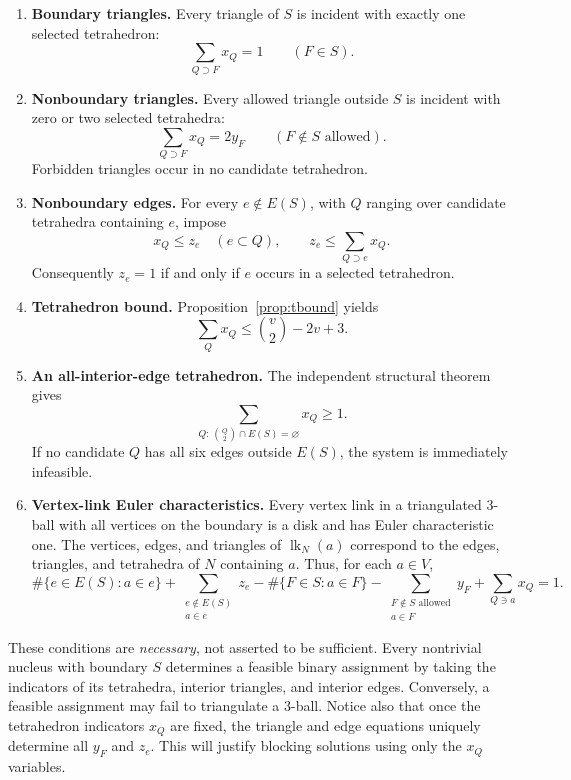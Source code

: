 \documentclass[11pt]{article}
\begin{document}
\begin{enumerate}[label=(\arabic*),leftmargin=*]
\item \textbf{Boundary triangles.} Every triangle of $S$ is incident with
exactly one selected tetrahedron:
\[
 \sum_{Q\supset F}x_Q=1\qquad(F\in S).
\]

\item \textbf{Nonboundary triangles.} Every allowed triangle outside $S$
is incident with zero or two selected tetrahedra:
\[
 \sum_{Q\supset F}x_Q=2y_F
 \qquad(F\notin S\text{ allowed}).
\]
Forbidden triangles occur in no candidate tetrahedron.

\item \textbf{Nonboundary edges.} For every $e\notin E(S)$, with
$Q$ ranging over candidate tetrahedra containing $e$, impose
\[
 x_Q\le z_e\quad(e\subset Q),\qquad
 z_e\le\sum_{Q\supset e}x_Q.
\]
Consequently $z_e=1$ if and only if $e$ occurs in a selected tetrahedron.

\item \textbf{Tetrahedron bound.} Proposition~\ref{prop:tbound} yields
\[
 \sum_Qx_Q\le\binom v2-2v+3.
\]

\item \textbf{An all-interior-edge tetrahedron.} The independent structural
theorem gives
\[
 \sum_{Q:\,\binom Q2\cap E(S)=\varnothing}x_Q\ge1.
\]
If no candidate $Q$ has all six edges outside $E(S)$, the system is
immediately infeasible.

\item \textbf{Vertex-link Euler characteristics.} Every vertex link in
a triangulated $3$-ball with all vertices on the boundary is a disk and
has Euler characteristic one.  The vertices, edges, and triangles of
$\operatorname{lk}_N(a)$ correspond to the edges, triangles, and tetrahedra
of $N$ containing $a$.  Thus, for each $a\in V$,
\[
 \#\{e\in E(S):a\in e\}
 +\sum_{\substack{e\notin E(S)\\a\in e}}z_e
 -\#\{F\in S:a\in F\}
 -\sum_{\substack{F\notin S\text{ allowed}\\a\in F}}y_F
 +\sum_{Q\ni a}x_Q=1.
\]
\end{enumerate}

These conditions are \emph{necessary}, not asserted to be sufficient.
Every nontrivial nucleus with boundary $S$ determines a feasible binary
assignment by taking the indicators of its tetrahedra, interior triangles,
and interior edges.  Conversely, a feasible assignment may fail to triangulate
a $3$-ball.  Notice also that once the tetrahedron indicators $x_Q$ are
fixed, the triangle and edge equations uniquely determine all $y_F$ and
$z_e$.  This will justify blocking solutions using only the $x_Q$ variables.
\end{document}
